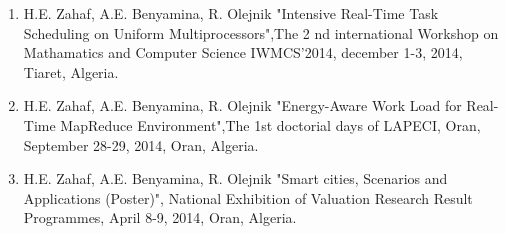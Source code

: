 \begin{enumerate}
\item H.E. Zahaf, A.E. Benyamina, R. Olejnik "Intensive Real-Time Task
  Scheduling on Uniform Multiprocessors",The 2 nd international
  Workshop on Mathamatics and Computer Science IWMCS'2014, december
  1-3, 2014, Tiaret, Algeria.\cite{me7}
    
\item H.E. Zahaf, A.E. Benyamina, R. Olejnik "Energy-Aware Work Load
  for Real-Time MapReduce Environment",The 1st doctorial days of
  LAPECI, Oran, September 28-29, 2014, Oran, Algeria.\cite{me8}

\item H.E. Zahaf, A.E. Benyamina, R. Olejnik "Smart cities, Scenarios
  and Applications (Poster)", National Exhibition of Valuation Research
  Result Programmes, April 8-9, 2014, Oran, Algeria.\cite{me9}
\end{enumerate}
